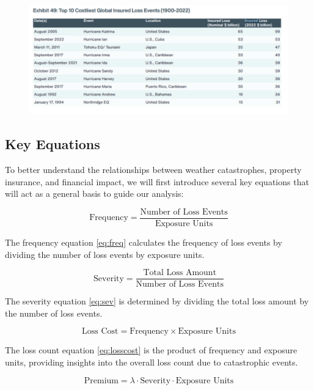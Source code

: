 \documentclass[12pt]{article}
\begin{document}
\begin{figure}[ht]
    \centering
    \includegraphics[width=0.8\linewidth]{AON Top 10 Global Insured Loss Events.pdf}
    \label{fig:10global_loss}
    \cite{aon}
\end{figure}



\subsection{Key Equations}

To better understand the relationships between weather catastrophes, property insurance, and financial impact, we will first introduce 
several key equations that will act as a general basis to guide our analysis:

\begin{equation}
    \label{eq:freq}
    \text{Frequency} = \frac{\text{Number of Loss Events}}{\text{Exposure Units}}
\end{equation}

The frequency equation \ref{eq:freq} calculates the frequency of loss events by dividing the number of loss events by exposure units.

\begin{equation}
    \label{eq:sev}
    \text{Severity} = \frac{\text{Total Loss Amount}}{\text{Number of Loss Events}}
\end{equation}

The severity equation \ref{eq:sev} is determined by dividing the total loss amount by the number of loss events.

\begin{equation}
    \label{eq:losscost}
    \text{Loss Cost} = \text{Frequency} \times \text{Exposure Units}
\end{equation}

The loss count equation \ref{eq:losscost} is the product of frequency and exposure units, providing insights into the overall loss count due to catastrophic events.

\begin{equation}
    \label{eq:premium}
    \text{Premium} = \lambda \cdot \text{Severity} \cdot \text{Exposure Units}
\end{equation}
\end{document}
